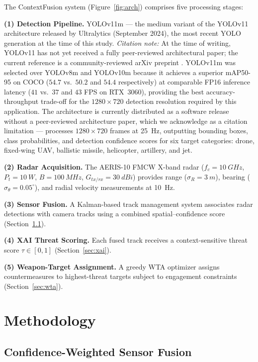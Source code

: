 \documentclass[drones,article,submit,pdftex]{Definitions/mdpi}
\begin{document}
The ContextFusion system (Figure~\ref{fig:arch}) comprises five processing stages:

\textbf{(1) Detection Pipeline.} YOLOv11m \cite{ref_yolov11} --- the medium
variant of the YOLOv11 architecture released by Ultralytics (September 2024),
the most recent YOLO generation at the time of this study.
\emph{Citation note:} At the time of writing, YOLOv11 has not yet received
a fully peer-reviewed architectural paper; the current reference is a
community-reviewed arXiv preprint \cite{ref_yolov11}.
YOLOv11m was selected over YOLOv8m and YOLOv10m because it achieves a
superior mAP50-95 on COCO ($54.7$ vs.\ $50.2$ and $54.4$ respectively) at
comparable FP16 inference latency ($41$ vs.\ $37$ and $43$ FPS on RTX~3060),
providing the best accuracy-throughput trade-off for the $1280\times720$
detection resolution required by this application.
The architecture is
currently distributed as a software release without a peer-reviewed architecture
paper, which we acknowledge as a citation limitation --- processes
$1280 \times 720$ frames at \SI{25}{Hz}, outputting bounding boxes,
class probabilities, and detection confidence scores for six target
categories: drone, fixed-wing UAV, ballistic missile, helicopter,
artillery, and jet.

\textbf{(2) Radar Acquisition.} The AERIS-10 FMCW X-band radar
($f_c = \SI{10}{GHz}$, $P_t = \SI{10}{W}$, $B = \SI{100}{MHz}$,
$G_{tx/rx} = \SI{30}{dBi}$) provides range ($\sigma_R = \SI{3}{m}$),
bearing ($\sigma_\theta = 0.05^\circ$), and radial velocity measurements
at \SI{10}{Hz}.

\textbf{(3) Sensor Fusion.} A Kalman-based track management system
associates radar detections with camera tracks using a combined
spatial--confidence score (Section~\ref{sec:fusion}).

\textbf{(4) XAI Threat Scoring.} Each fused track receives a context-sensitive
threat score $\tau \in [0, 1]$ (Section~\ref{sec:xai}).

\textbf{(5) Weapon-Target Assignment.} A greedy WTA optimizer assigns
countermeasures to highest-threat targets subject to engagement constraints
(Section~\ref{sec:wta}).

\section{Methodology}
\label{sec:method}

\subsection{Confidence-Weighted Sensor Fusion}
\label{sec:fusion}
\end{document}
